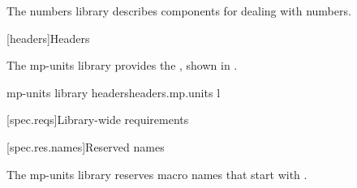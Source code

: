 \pnum
The numbers library
describes components for dealing with numbers.

[headers]{Headers}

\pnum
The mp-units library provides the
,
shown in .

\begin{multicolfloattable}{mp-units library headers}{headers.mp.units}
{l}
 \\
\end{multicolfloattable}

[spec.reqs]{Library-wide requirements}

[spec.res.names]{Reserved names}

\pnum
The mp-units library reserves macro names that start with
.
